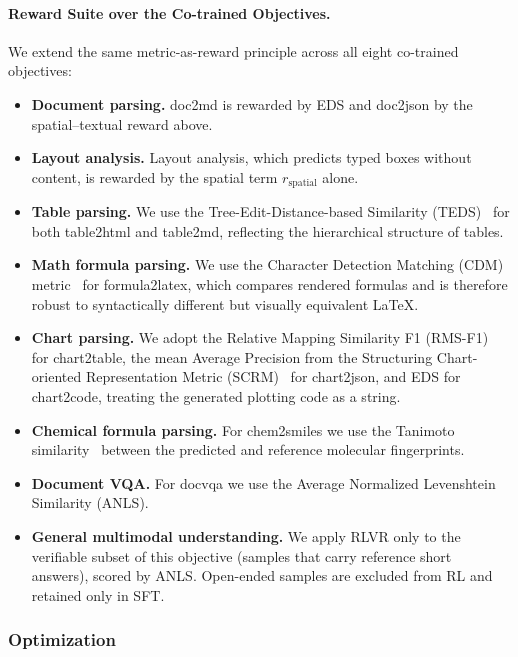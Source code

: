 \paragraph{Reward Suite over the Co-trained Objectives.}
We extend the same metric-as-reward principle across all eight co-trained objectives:
\begin{itemize}[leftmargin=1.0em, labelsep=0.5em]
    \item \textbf{Document parsing.} doc2md is rewarded by EDS and doc2json by the spatial--textual reward above.
    \item \textbf{Layout analysis.} Layout analysis, which predicts typed boxes without content, is rewarded by the spatial term $r_{\mathrm{spatial}}$ alone.
    \item \textbf{Table parsing.} We use the Tree-Edit-Distance-based Similarity (TEDS)~\cite{zhong2020image} for both table2html and table2md, reflecting the hierarchical structure of tables.
    \item \textbf{Math formula parsing.} We use the Character Detection Matching (CDM) metric~\cite{wang2025imagetexttransformingformula} for formula2latex, which compares rendered formulas and is therefore robust to syntactically different but visually equivalent LaTeX.
    \item \textbf{Chart parsing.} We adopt the Relative Mapping Similarity F1 (RMS-F1)~\cite{liu2023deplot} for chart2table, the mean Average Precision from the Structuring Chart-oriented Representation Metric (SCRM)~\cite{xia2023structchart} for chart2json, and EDS for chart2code, treating the generated plotting code as a string.
    \item \textbf{Chemical formula parsing.} For chem2smiles we use the Tanimoto similarity~\cite{tanimoto1958elementary} between the predicted and reference molecular fingerprints.
    \item \textbf{Document VQA.} For docvqa we use the Average Normalized Levenshtein Similarity (ANLS).
    \item \textbf{General multimodal understanding.} We apply RLVR only to the verifiable subset of this objective (samples that carry reference short answers), scored by ANLS. Open-ended samples are excluded from RL and retained only in SFT.
\end{itemize}

\subsubsection{Optimization}
\label{sec:rl_opt}

